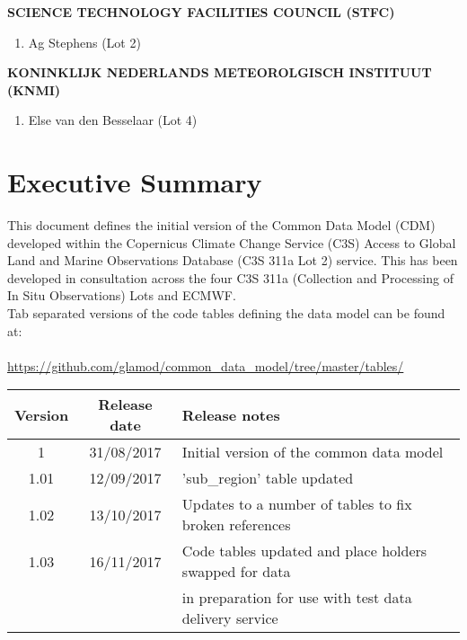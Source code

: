 \documentclass[a4paper,12pt]{article}
\begin{document}
\begin{adjustwidth}{2.cm}{}
{\fontsize{14}{17} \selectfont \textbf{\uppercase{Science Technology Facilities Council (STFC)}}}
\begin{enumerate}
\item Ag Stephens (Lot 2)\\
\end{enumerate}

{\fontsize{14}{17} \selectfont \textbf{\uppercase{Koninklijk Nederlands Meteorolgisch Instituut (KNMI)}}}
\begin{enumerate}
\item Else van den Besselaar (Lot 4)
\end{enumerate}

\end{adjustwidth}


\newpage

\section*{Executive Summary}
This document defines the initial version of the Common Data Model (CDM) developed within the Copernicus Climate Change Service (C3S) Access to Global Land and Marine Observations Database (C3S 311a Lot 2) service. This has been developed in consultation across the four C3S 311a (Collection and Processing of In Situ Observations) Lots and ECMWF.\\

Tab separated versions of the code tables defining the data model can be found at:\\ \\
\tabto{2cm} \url{https://github.com/glamod/common_data_model/tree/master/tables/}

\begin{table}[H]
\centering
\begin{tabular}{|c|c|l|}
\hline
\textbf{Version} & \textbf{Release date} & \textbf{Release notes}\\
\hline
1 & 31/08/2017 & Initial version of the common data model\\
1.01 & 12/09/2017 & 'sub\_region' table updated\\
1.02 & 13/10/2017 & Updates to a number of tables to fix broken references\\
1.03 & 16/11/2017 & Code tables updated and place holders swapped for data\\
& & in preparation for use with test data delivery service\\
\hline
\end{tabular}
\end{table}
\end{document}
